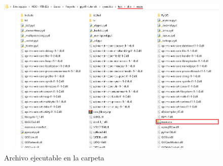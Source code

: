 \begin{figure}[H]
    \centering
    \includegraphics[width=0.9\linewidth]{imagenes/kt/main.png}
    \caption{Archivo ejecutable en la carpeta}
    \label{fig:ejecutable_kt}
\end{figure}


